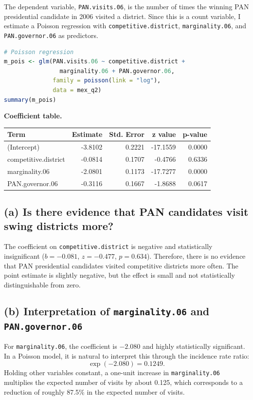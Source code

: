 \documentclass[12pt,letterpaper]{article}
\begin{document}
The dependent variable, \texttt{PAN.visits.06}, is the number of times the winning PAN presidential candidate in 2006 visited a district. Since this is a count variable, I estimate a Poisson regression with \texttt{competitive.district}, \texttt{marginality.06}, and \texttt{PAN.governor.06} as predictors.

\begin{lstlisting}[language=R]
# Poisson regression
m_pois <- glm(PAN.visits.06 ~ competitive.district +
                marginality.06 + PAN.governor.06,
              family = poisson(link = "log"),
              data = mex_q2)
summary(m_pois)
\end{lstlisting}

\noindent\textbf{Coefficient table.}

\begin{center}
\begin{tabular}{lrrrr}
\toprule
Term & Estimate & Std. Error & z value & p-value \\
\midrule
(Intercept)           & -3.8102 & 0.2221 & -17.1559 & 0.0000 \\
competitive.district  & -0.0814 & 0.1707 &  -0.4766 & 0.6336 \\
marginality.06        & -2.0801 & 0.1173 & -17.7277 & 0.0000 \\
PAN.governor.06       & -0.3116 & 0.1667 &  -1.8688 & 0.0617 \\
\bottomrule
\end{tabular}
\end{center}

\subsection*{(a) Is there evidence that PAN candidates visit swing districts more?}
The coefficient on \texttt{competitive.district} is negative and statistically insignificant ($b = -0.081$, $z = -0.477$, $p = 0.634$). Therefore, there is no evidence that PAN presidential candidates visited competitive districts more often. The point estimate is slightly negative, but the effect is small and not statistically distinguishable from zero.

\subsection*{(b) Interpretation of \texttt{marginality.06} and \texttt{PAN.governor.06}}
For \texttt{marginality.06}, the coefficient is $-2.080$ and highly statistically significant. In a Poisson model, it is natural to interpret this through the incidence rate ratio:
\[
\exp(-2.080) = 0.1249.
\]
Holding other variables constant, a one-unit increase in \texttt{marginality.06} multiplies the expected number of visits by about 0.125, which corresponds to a reduction of roughly 87.5\% in the expected number of visits.
\end{document}
